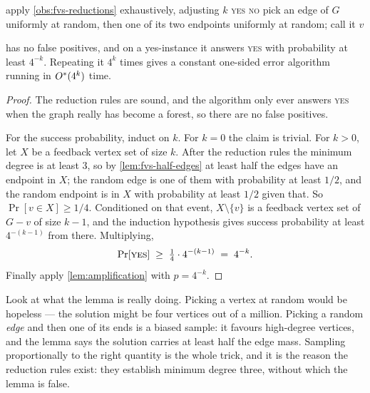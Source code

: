 \begin{algorithm}[ht]
\caption{Randomized }
\label{alg:fvs}
\begin{algorithmic}[1]
    \State apply \cref{obs:fvs-reductions} exhaustively, adjusting $k$
     \Return \textsc{yes} \EndIf
     \Return \textsc{no} \EndIf
    \State pick an edge of $G$ uniformly at random, then one of its two
           endpoints uniformly at random; call it $v$
    \State \Return {}
  \EndFunction
\end{algorithmic}
\end{algorithm}

\begin{theorem}\label{thm:fvs}
 has no false positives, and on a yes-instance it answers
\textsc{yes} with probability at least $4^{-k}$. Repeating it $4^k$ times gives
a constant one-sided error algorithm running in $O^{*}(4^k)$ time.
\end{theorem}

\begin{proof}
The reduction rules are sound, and the algorithm only ever answers \textsc{yes}
when the graph really has become a forest, so there are no false positives.

For the success probability, induct on $k$. For $k = 0$ the claim is trivial.
For $k > 0$, let $X$ be a feedback vertex set of size $k$. After the reduction
rules the minimum degree is at least $3$, so by \cref{lem:fvs-half-edges} at
least half the edges have an endpoint in $X$; the random edge is one of them
with probability at least $1/2$, and the random endpoint is in $X$ with
probability at least $1/2$ given that. So $\Pr[v \in X] \ge 1/4$. Conditioned on
that event, $X \setminus \{v\}$ is a feedback vertex set of $G - v$ of size
$k-1$, and the induction hypothesis gives success probability at least
$4^{-(k-1)}$ from there. Multiplying,
\[ \Pr[\textsc{yes}] \;\ge\; \tfrac14 \cdot 4^{-(k-1)} \;=\; 4^{-k}. \]
Finally apply \cref{lem:amplification} with $p = 4^{-k}$.
\end{proof}

\begin{intuition}
Look at what the lemma is really doing. Picking a vertex at random would be
hopeless --- the solution might be four vertices out of a million. Picking a
random \emph{edge} and then one of its ends is a biased sample: it favours
high-degree vertices, and the lemma says the solution carries at least half the
edge mass. Sampling proportionally to the right quantity is the whole trick, and
it is the reason the reduction rules exist: they establish minimum degree
three, without which the lemma is false.
\end{intuition}

